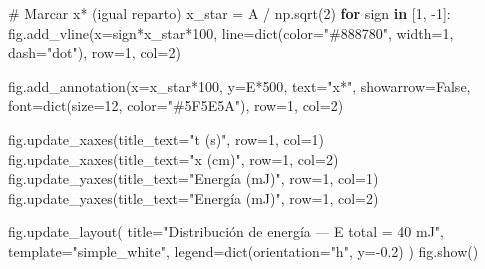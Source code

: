 \documentclass[
  letterpaper,
  DIV=11,
  numbers=noendperiod]{scrreprt}
\newenvironment{Shaded}{\begin{snugshade}}{\end{snugshade}}
\newcommand{\BuiltInTok}[1]{\textcolor[rgb]{0.00,0.23,0.31}{#1}}
\newcommand{\CommentTok}[1]{\textcolor[rgb]{0.37,0.37,0.37}{#1}}
\newcommand{\ControlFlowTok}[1]{\textcolor[rgb]{0.00,0.23,0.31}{\textbf{#1}}}
\newcommand{\DecValTok}[1]{\textcolor[rgb]{0.68,0.00,0.00}{#1}}
\newcommand{\FloatTok}[1]{\textcolor[rgb]{0.68,0.00,0.00}{#1}}
\newcommand{\KeywordTok}[1]{\textcolor[rgb]{0.00,0.23,0.31}{\textbf{#1}}}
\newcommand{\NormalTok}[1]{\textcolor[rgb]{0.00,0.23,0.31}{#1}}
\newcommand{\OperatorTok}[1]{\textcolor[rgb]{0.37,0.37,0.37}{#1}}
\newcommand{\StringTok}[1]{\textcolor[rgb]{0.13,0.47,0.30}{#1}}
\newcommand{\VariableTok}[1]{\textcolor[rgb]{0.07,0.07,0.07}{#1}}
\begin{document}
\begin{Shaded}
\begin{Highlighting}[]
\CommentTok{\# Marcar x* (igual reparto)}
\NormalTok{x\_star }\OperatorTok{=}\NormalTok{ A }\OperatorTok{/}\NormalTok{ np.sqrt(}\DecValTok{2}\NormalTok{)}
\ControlFlowTok{for}\NormalTok{ sign }\KeywordTok{in}\NormalTok{ [}\DecValTok{1}\NormalTok{, }\OperatorTok{{-}}\DecValTok{1}\NormalTok{]:}
\NormalTok{    fig.add\_vline(x}\OperatorTok{=}\NormalTok{sign}\OperatorTok{*}\NormalTok{x\_star}\OperatorTok{*}\DecValTok{100}\NormalTok{,}
\NormalTok{        line}\OperatorTok{=}\BuiltInTok{dict}\NormalTok{(color}\OperatorTok{=}\StringTok{"\#888780"}\NormalTok{, width}\OperatorTok{=}\DecValTok{1}\NormalTok{, dash}\OperatorTok{=}\StringTok{"dot"}\NormalTok{), row}\OperatorTok{=}\DecValTok{1}\NormalTok{, col}\OperatorTok{=}\DecValTok{2}\NormalTok{)}

\NormalTok{fig.add\_annotation(x}\OperatorTok{=}\NormalTok{x\_star}\OperatorTok{*}\DecValTok{100}\NormalTok{, y}\OperatorTok{=}\NormalTok{E}\OperatorTok{*}\DecValTok{500}\NormalTok{, text}\OperatorTok{=}\StringTok{"x*"}\NormalTok{, showarrow}\OperatorTok{=}\VariableTok{False}\NormalTok{,}
\NormalTok{    font}\OperatorTok{=}\BuiltInTok{dict}\NormalTok{(size}\OperatorTok{=}\DecValTok{12}\NormalTok{, color}\OperatorTok{=}\StringTok{"\#5F5E5A"}\NormalTok{), row}\OperatorTok{=}\DecValTok{1}\NormalTok{, col}\OperatorTok{=}\DecValTok{2}\NormalTok{)}

\NormalTok{fig.update\_xaxes(title\_text}\OperatorTok{=}\StringTok{"t (s)"}\NormalTok{, row}\OperatorTok{=}\DecValTok{1}\NormalTok{, col}\OperatorTok{=}\DecValTok{1}\NormalTok{)}
\NormalTok{fig.update\_xaxes(title\_text}\OperatorTok{=}\StringTok{"x (cm)"}\NormalTok{, row}\OperatorTok{=}\DecValTok{1}\NormalTok{, col}\OperatorTok{=}\DecValTok{2}\NormalTok{)}
\NormalTok{fig.update\_yaxes(title\_text}\OperatorTok{=}\StringTok{"Energía (mJ)"}\NormalTok{, row}\OperatorTok{=}\DecValTok{1}\NormalTok{, col}\OperatorTok{=}\DecValTok{1}\NormalTok{)}
\NormalTok{fig.update\_yaxes(title\_text}\OperatorTok{=}\StringTok{"Energía (mJ)"}\NormalTok{, row}\OperatorTok{=}\DecValTok{1}\NormalTok{, col}\OperatorTok{=}\DecValTok{2}\NormalTok{)}

\NormalTok{fig.update\_layout(}
\NormalTok{    title}\OperatorTok{=}\StringTok{"Distribución de energía — E total = 40 mJ"}\NormalTok{,}
\NormalTok{    template}\OperatorTok{=}\StringTok{"simple\_white"}\NormalTok{,}
\NormalTok{    legend}\OperatorTok{=}\BuiltInTok{dict}\NormalTok{(orientation}\OperatorTok{=}\StringTok{"h"}\NormalTok{, y}\OperatorTok{={-}}\FloatTok{0.2}\NormalTok{)}
\NormalTok{)}
\NormalTok{fig.show()}
\end{Highlighting}
\end{Shaded}
\end{document}
